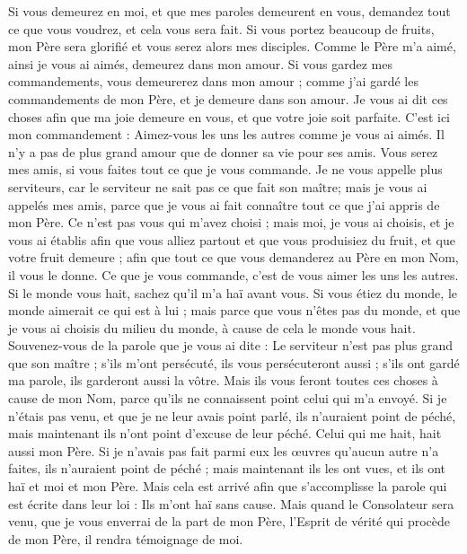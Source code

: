 \begin{multicols}{2}
Si vous demeurez en moi, et que mes paroles demeurent en vous, demandez tout ce que vous voudrez, et cela vous sera fait.
Si vous portez beaucoup de fruits, mon Père sera glorifié et vous serez alors mes disciples.
Comme le Père m'a aimé, ainsi je vous ai aimés, demeurez dans mon amour.
Si vous gardez mes commandements, vous demeurerez dans mon amour ; comme j'ai gardé les commandements de mon Père, et je demeure dans son amour.
Je vous ai dit ces choses afin que ma joie demeure en vous, et que votre joie soit parfaite.
C'est ici mon commandement : Aimez-vous les uns les autres comme je vous ai aimés.
Il n'y a pas de plus grand amour que de donner sa vie pour ses amis.
Vous serez mes amis, si vous faites tout ce que je vous commande.
Je ne vous appelle plus serviteurs, car le serviteur ne sait pas ce que fait son maître; mais je vous ai appelés mes amis, parce que je vous ai fait connaître tout ce que j'ai appris de mon Père.
Ce n'est pas vous qui m'avez choisi ; mais moi, je vous ai choisis, et je vous ai établis afin que vous alliez partout et que vous produisiez du fruit, et que votre fruit demeure ; afin que tout ce que vous demanderez au Père en mon Nom, il vous le donne.
Ce que je vous commande, c'est de vous aimer les uns les autres.
Si le monde vous hait, sachez qu'il m'a haï avant vous.
Si vous étiez du monde, le monde aimerait ce qui est à lui ; mais parce que vous n'êtes pas du monde, et que je vous ai choisis du milieu du monde, à cause de cela le monde vous hait.
Souvenez-vous de la parole que je vous ai dite : Le serviteur n'est pas plus grand que son maître ; s'ils m'ont persécuté, ils vous persécuteront aussi ; s'ils ont gardé ma parole, ils garderont aussi la vôtre.
Mais ils vous feront toutes ces choses à cause de mon Nom, parce qu'ils ne connaissent point celui qui m'a envoyé.
Si je n'étais pas venu, et que je ne leur avais point parlé, ils n'auraient point de péché, mais maintenant ils n'ont point d'excuse de leur péché.
Celui qui me hait, hait aussi mon Père.
Si je n'avais pas fait parmi eux les œuvres qu'aucun autre n'a faites, ils n'auraient point de péché ; mais maintenant ils les ont vues, et ils ont haï et moi et mon Père.
Mais cela est arrivé afin que s'accomplisse la parole qui est écrite dans leur loi : Ils m'ont haï sans cause.
Mais quand le Consolateur sera venu, que je vous enverrai de la part de mon Père, l'Esprit de vérité qui procède de mon Père, il rendra témoignage de moi.

\end{multicols}
